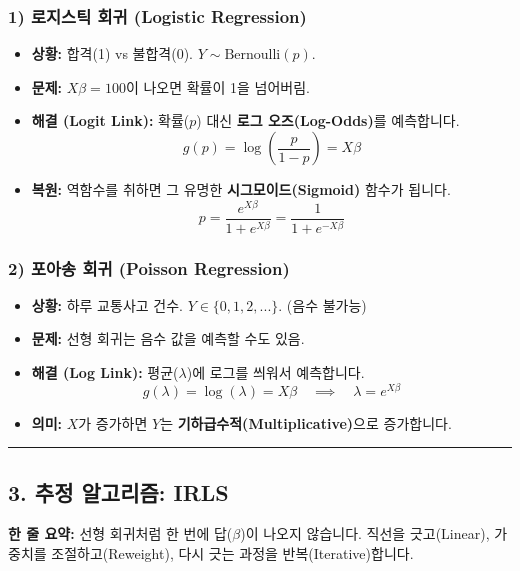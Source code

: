 \documentclass[11pt,a4paper]{book}
\theoremstyle{definition}
\begin{document}
\subsubsection*{1) 로지스틱 회귀 (Logistic Regression)}
\begin{itemize}
    \item \textbf{상황:} 합격(1) vs 불합격(0). $Y \sim \text{Bernoulli}(p)$.
    \item \textbf{문제:} $X\beta = 100$이 나오면 확률이 1을 넘어버림.
    \item \textbf{해결 (Logit Link):} 확률($p$) 대신 \textbf{로그 오즈(Log-Odds)}를 예측합니다.
    $$ g(p) = \log \left( \frac{p}{1-p} \right) = X\beta $$
    \item \textbf{복원:} 역함수를 취하면 그 유명한 \textbf{시그모이드(Sigmoid)} 함수가 됩니다.
    $$ p = \frac{e^{X\beta}}{1 + e^{X\beta}} = \frac{1}{1 + e^{-X\beta}} $$
\end{itemize}

\subsubsection*{2) 포아송 회귀 (Poisson Regression)}
\begin{itemize}
    \item \textbf{상황:} 하루 교통사고 건수. $Y \in \{0, 1, 2, ...\}$. (음수 불가능)
    \item \textbf{문제:} 선형 회귀는 음수 값을 예측할 수도 있음.
    \item \textbf{해결 (Log Link):} 평균($\lambda$)에 로그를 씌워서 예측합니다.
    $$ g(\lambda) = \log(\lambda) = X\beta \quad \implies \quad \lambda = e^{X\beta} $$
    \item \textbf{의미:} $X$가 증가하면 $Y$는 \textbf{기하급수적(Multiplicative)}으로 증가합니다.
\end{itemize}

\vspace{0.5cm}\hrule\vspace{0.5cm}

\subsection{3. 추정 알고리즘: IRLS}

\begin{conceptbox}[title={개념 3: 산을 오르는 반복적인 걸음}]
\textbf{한 줄 요약:} 선형 회귀처럼 한 번에 답($\beta$)이 나오지 않습니다. 직선을 긋고(Linear), 가중치를 조절하고(Reweight), 다시 긋는 과정을 반복(Iterative)합니다.
\end{conceptbox}
\end{document}
